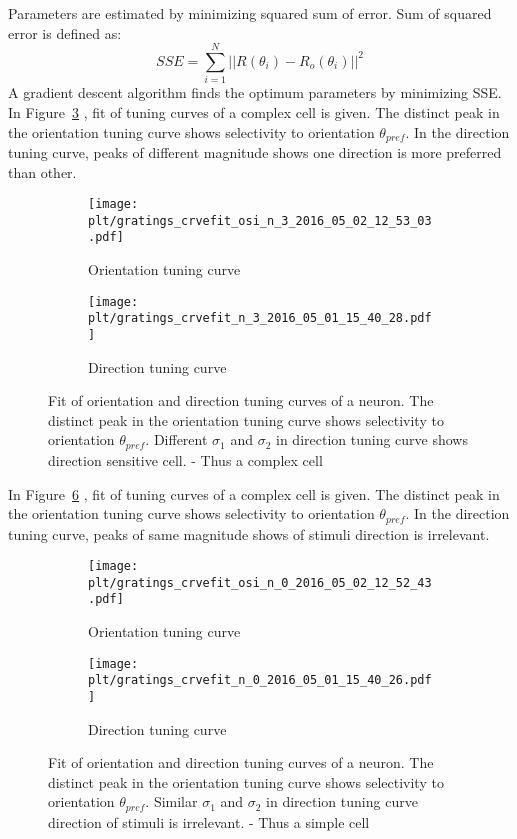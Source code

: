 \documentclass[MTech]{iitmdiss}
\newcommand{\plt}{thesis_plots}
\begin{document}
Parameters are estimated by minimizing squared sum of error. Sum of squared error is defined as:
$$SSE = \sum_{i=1}^N ||R(\theta_i) - R_o(\theta_i)||^2$$
A gradient descent algorithm finds the optimum parameters by minimizing SSE.
In Figure~\ref{fig:curvefit_complex} , fit of tuning curves of a complex cell is given. The distinct peak in the orientation tuning curve shows selectivity to orientation $\theta_{pref}$. In the direction tuning curve, peaks of different magnitude shows one direction is more preferred than other.
\begin{figure}[h]
  \begin{subfigure}[b]{0.5\textwidth}
    \texttt{[image: \\plt/gratings\_crvefit\_osi\_n\_3\_2016\_05\_02\_12\_53\_03.pdf]}
    \caption{Orientation tuning curve}
    \label{fig:oritune_complex}
  \end{subfigure}%
  \begin{subfigure}[b]{0.5\textwidth}
    \texttt{[image: \\plt/gratings\_crvefit\_n\_3\_2016\_05\_01\_15\_40\_28.pdf]}
    \caption{Direction tuning curve}
    \label{fig:dirtune_complex}
  \end{subfigure}%
  \caption{Fit of orientation and direction tuning curves of a neuron. The distinct peak in the orientation tuning curve shows selectivity to orientation $\theta_{pref}$. Different $\sigma_1$ and $\sigma_2$ in direction tuning curve shows direction sensitive cell. - Thus a complex cell}\label{fig:curvefit_complex}
\end{figure}
In Figure~\ref{fig:curvefit_simple} , fit of tuning curves of a complex cell is given. The distinct peak in the orientation tuning curve shows selectivity to orientation $\theta_{pref}$. In the direction tuning curve, peaks of same magnitude shows of stimuli direction is irrelevant.
\begin{figure}[h]
  \begin{subfigure}[b]{0.5\textwidth}
    \texttt{[image: \\plt/gratings\_crvefit\_osi\_n\_0\_2016\_05\_02\_12\_52\_43.pdf]}
    \caption{Orientation tuning curve}
    \label{fig:oritune_simple}
  \end{subfigure}%
  \begin{subfigure}[b]{0.5\textwidth}
    \texttt{[image: \\plt/gratings\_crvefit\_n\_0\_2016\_05\_01\_15\_40\_26.pdf]}
    \caption{Direction tuning curve}
    \label{fig:dirtune_simple}
  \end{subfigure}%
  \caption{Fit of orientation and direction tuning curves of a neuron. The distinct peak in the orientation tuning curve shows selectivity to orientation $\theta_{pref}$. Similar $\sigma_1$ and $\sigma_2$ in direction tuning curve direction of stimuli is irrelevant. - Thus a simple cell}\label{fig:curvefit_simple}
\end{figure}
\end{document}
